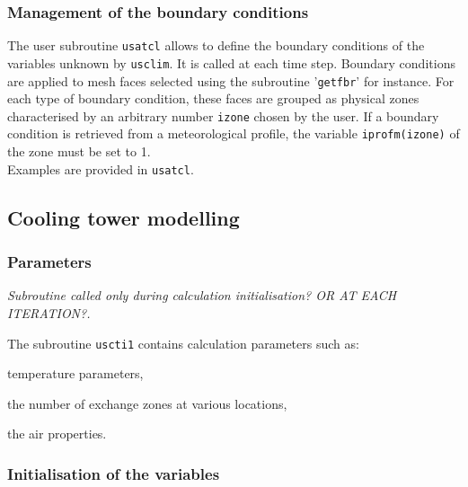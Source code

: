 {{{%
\subsubsection{Management of the boundary conditions}

The user subroutine \texttt{usatcl} allows to define the boundary conditions of the variables
 unknown by \texttt{usclim}. It is called at each time step. Boundary conditions are 
applied to mesh faces selected using the subroutine '\texttt{getfbr}' for instance. For 
each type of boundary condition, these faces are grouped as physical zones characterised
 by an arbitrary number \texttt{izone} chosen by the user. If a boundary condition is 
retrieved from a meteorological profile, the variable \texttt{iprofm(izone)} of the zone
 must be set to 1.\\
Examples are provided in \texttt{usatcl}.

\subsection{Cooling tower modelling}

\subsubsection{Parameters}

\noindent
\textit{Subroutine called only during calculation initialisation? OR AT EACH ITERATION?.}

The subroutine \texttt{uscti1} contains calculation parameters such as:
\begin{list}{-}{}
 \item  temperature parameters,
 \item  the number of exchange zones at various locations,
 \item  the air properties.
\end{list}

\subsubsection{Initialisation of the variables}

}}}
